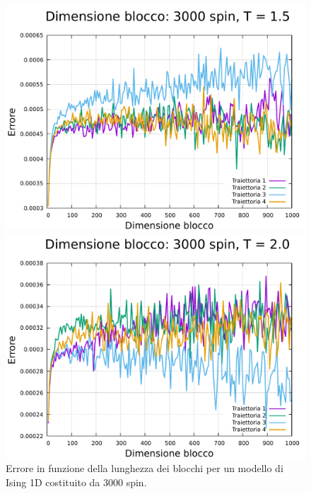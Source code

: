 \begin{figure}[htbp]
    \begin{minipage}{0.45\textwidth}  
      \centering
      \includegraphics[page=1, width=\textwidth]{Immagini/simIsing1D/magn0.02/lblk/err_3000_1.5.pdf}
      \caption{$T\,=\,1.5$}
    \end{minipage}\hfill
    \begin{minipage}{0.45\textwidth}  
      \centering
      \includegraphics[page=1, width=\textwidth]{Immagini/simIsing1D/magn0.02/lblk/err_3000_2.0.pdf}
      \caption{$T\,=\,2.0$}
    \end{minipage}
    \caption{Errore in funzione della lunghezza dei blocchi per un modello di Ising 1D costituito da 3000 spin.}
\end{figure}

